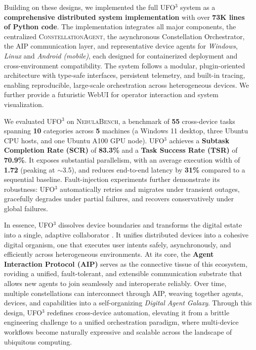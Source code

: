 \documentclass[10pt]{article} %
\newcommand{\ufo}{\textsc{UFO}$^3$\xspace}
\newcommand{\cagent}{\textsc{ConstellationAgent}\xspace}
\newcommand{\bench}{\textsc{NebulaBench}\xspace}
\begin{document}
Building on these designs, we implemented the full \ufo system as a \textbf{comprehensive distributed system implementation} with over \textbf{73K lines of Python code}. The implementation integrates all major components, the centralized \cagent, the asynchronous Constellation Orchestrator, the AIP communication layer, and representative device agents for \textit{Windows}, \textit{Linux} and \textit{Android (mobile)}, each designed for containerized deployment and cross-environment compatibility. The system follows a modular, plugin-oriented architecture with type-safe interfaces, persistent telemetry, and built-in tracing, enabling reproducible, large-scale orchestration across heterogeneous devices. We further provide a futuristic WebUI for operator interaction and system visualization.

We evaluated \ufo on \bench, a benchmark of \textbf{55} cross-device tasks spanning \textbf{10} categories across \textbf{5} machines (a Windows 11 desktop, three Ubuntu CPU hosts, and one Ubuntu A100 GPU node). \ufo achieves a \textbf{Subtask Completion Rate (SCR)} of \textbf{83.3\%} and a \textbf{Task Success Rate (TSR)} of \textbf{70.9\%}. It exposes substantial parallelism, with an average execution width of \textbf{1.72} (peaking at $\sim$3.5), and reduces end-to-end latency by \textbf{31\%} compared to a sequential baseline. Fault-injection experiments further demonstrate its robustness: \ufo automatically retries and migrates under transient outages, gracefully degrades under partial failures, and recovers conservatively under global failures.

In essence, \ufo dissolves device boundaries and transforms the digital estate into a single, adaptive collaborator \cite{brudy2018investigating, marks2020multi, zhang2018towards}. It unifies distributed devices into a cohesive digital organism, one that executes user intents safely, asynchronously, and efficiently across heterogeneous environments. At its core, the \textbf{Agent Interaction Protocol (AIP)} serves as the connective tissue of this ecosystem, roviding a unified, fault-tolerant, and extensible communication substrate that allows new agents to join seamlessly and interoperate reliably. Over time, multiple constellations can interconnect through AIP, weaving together agents, devices, and capabilities into a self-organizing \emph{Digital Agent Galaxy}. Through this design, \ufo redefines cross-device automation, elevating it from a brittle engineering challenge to a unified orchestration paradigm, where multi-device workflows become naturally expressive and scalable across the landscape of ubiquitous computing.
\end{document}
